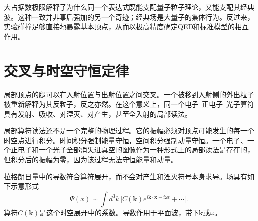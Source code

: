 大占据数极限解释了为什么同一个表达式既能支配量子粒子理论，又能支配其经典波。这种一致并非事后强加的另一个奇迹；经典场是大量子的集体行为。反过来，实验碰撞足够直接地暴露基本顶点，从而以极高精度确定QED和标准模型的相互作用。

\section{交叉与时空守恒定律}

局部顶点的腿可以在入射位置与出射位置之间交叉。一个被移到入射侧的外出粒子被重新解释为其反粒子，反之亦然。在这个意义上，同一个电子--正电子--光子算符具有发射、吸收、对湮灭、对产生，甚至全入射的局部读法。

\begin{classroomqa}
\end{classroomqa}

局部算符读法还不是一个完整的物理过程。它的振幅必须对顶点可能发生的每一个时空点进行积分。时间积分强制能量守恒，空间积分强制动量守恒。一个电子、一个正电子和一个光子全部消失进真空的图像作为一种形式上的局部读法是存在的，但积分后的振幅为零，因为该过程无法守恒能量和动量。

\begin{classroomqa}
\end{classroomqa}

\begin{classroomqa}
\end{classroomqa}

拉格朗日量中的导数符合算符展开，而不会对产生和湮灭符号本身求导。场具有如下示意形式
\begin{equation}
\Psi(x)
\sim
\int d^3k\,
\bigl[
C(\mathbf k)e^{i\mathbf k\cdot\mathbf x-i\omega t}
+\cdots
\bigr].
\end{equation}
算符\(C(\mathbf k)\)是这个时空展开中的系数。导数作用于平面波，带下\(\mathbf k\)或\(\omega\)。

